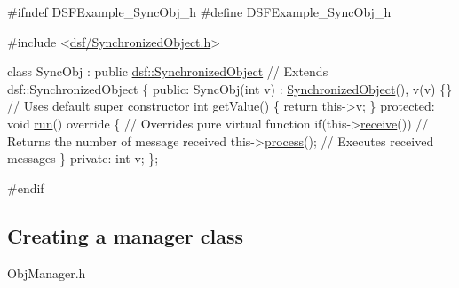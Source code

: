 \begin{DoxyCodeInclude}
\textcolor{preprocessor}{#ifndef DSFExample\_SyncObj\_h}
\textcolor{preprocessor}{#define DSFExample\_SyncObj\_h}

\textcolor{preprocessor}{#include <\hyperlink{_synchronized_object_8h}{dsf/SynchronizedObject.h}>}

\textcolor{keyword}{class }SyncObj : \textcolor{keyword}{public} \hyperlink{classdsf_1_1_synchronized_object}{dsf::SynchronizedObject} \textcolor{comment}{// Extends dsf::SynchronizedObject}
\{
\textcolor{keyword}{public}:
    SyncObj(\textcolor{keywordtype}{int} v) : \hyperlink{namespacedsf_acbf1798fc56cfb1707162a17e13f5fda}{SynchronizedObject}(), v(v) \{\} \textcolor{comment}{// Uses default super constructor}
    \textcolor{keywordtype}{int} getValue() \{
        \textcolor{keywordflow}{return} this->v;
    \}
\textcolor{keyword}{protected}:
    \textcolor{keywordtype}{void} \hyperlink{classdsf_1_1_synchronized_object_ae94875bd63d8071f8a563ac45ca7ccc2}{run}()\textcolor{keyword}{ override }\{ \textcolor{comment}{// Overrides pure virtual function}
        \textcolor{keywordflow}{if}(this->\hyperlink{classdsf_1_1_synchronized_object_a3ce496c6aaecc4b0ca3a4d09539a4920}{receive}()) \textcolor{comment}{// Returns the number of message received}
            this->\hyperlink{classdsf_1_1_task_box_ad35070ac305146aaa4073b2078d9209e}{process}(); \textcolor{comment}{// Executes received messages}
    \}
\textcolor{keyword}{private}:
    \textcolor{keywordtype}{int} v;
\};

\textcolor{preprocessor}{#endif}
\end{DoxyCodeInclude}
\hypertarget{index_manager}{}\subsection{Creating a manager class}\label{index_manager}
Obj\+Manager.\+h 
